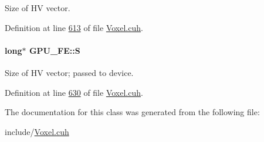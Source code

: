 Size of HV vector. 



Definition at line \hyperlink{Voxel_8cuh_source_l00613}{613} of file \hyperlink{Voxel_8cuh_source}{Voxel.\+cuh}.

\paragraph[{\texorpdfstring{S}{S}}]{\setlength{\rightskip}{0pt plus 5cm}long$\ast$ G\+P\+U\+\_\+\+F\+E\+::S\hspace{0.3cm}{\ttfamily [private]}}\hypertarget{classGPU__FE_a1e2b5d0d82b739ab93b43e2bb862392a}{}\label{classGPU__FE_a1e2b5d0d82b739ab93b43e2bb862392a}


Size of HV vector; passed to device. 



Definition at line \hyperlink{Voxel_8cuh_source_l00630}{630} of file \hyperlink{Voxel_8cuh_source}{Voxel.\+cuh}.



The documentation for this class was generated from the following file\+:\begin{DoxyCompactItemize}
\item 
include/\hyperlink{Voxel_8cuh}{Voxel.\+cuh}\end{DoxyCompactItemize}
